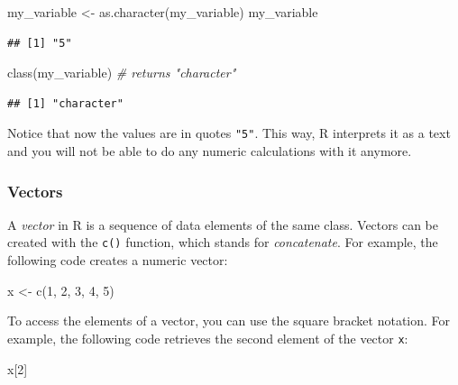 \documentclass[
]{book}
\newenvironment{Shaded}{\begin{snugshade}}{\end{snugshade}}
\newcommand{\CommentTok}[1]{\textcolor[rgb]{0.56,0.35,0.01}{\textit{#1}}}
\newcommand{\DecValTok}[1]{\textcolor[rgb]{0.00,0.00,0.81}{#1}}
\newcommand{\FunctionTok}[1]{\textcolor[rgb]{0.00,0.00,0.00}{#1}}
\newcommand{\NormalTok}[1]{#1}
\newcommand{\OtherTok}[1]{\textcolor[rgb]{0.56,0.35,0.01}{#1}}
\begin{document}
\begin{Shaded}
\begin{Highlighting}[]
\NormalTok{my\_variable }\OtherTok{\textless{}{-}} \FunctionTok{as.character}\NormalTok{(my\_variable)}
\NormalTok{my\_variable}
\end{Highlighting}
\end{Shaded}

\begin{verbatim}
## [1] "5"
\end{verbatim}

\begin{Shaded}
\begin{Highlighting}[]
\FunctionTok{class}\NormalTok{(my\_variable) }\CommentTok{\# returns "character"}
\end{Highlighting}
\end{Shaded}

\begin{verbatim}
## [1] "character"
\end{verbatim}

Notice that now the values are in quotes \texttt{"5"}. This way, R interprets it as a text and you will not be able to do any numeric calculations with it anymore.

\hypertarget{vectors}{%
\subsubsection{Vectors}\label{vectors}}

A \emph{vector} in R is a sequence of data elements of the same class. Vectors can be created with the \texttt{c()} function, which stands for \emph{concatenate}. For example, the following code creates a numeric vector:

\begin{Shaded}
\begin{Highlighting}[]
\NormalTok{x }\OtherTok{\textless{}{-}} \FunctionTok{c}\NormalTok{(}\DecValTok{1}\NormalTok{, }\DecValTok{2}\NormalTok{, }\DecValTok{3}\NormalTok{, }\DecValTok{4}\NormalTok{, }\DecValTok{5}\NormalTok{)}
\end{Highlighting}
\end{Shaded}

To access the elements of a vector, you can use the square bracket notation. For example, the following code retrieves the second element of the vector \texttt{x}:

\begin{Shaded}
\begin{Highlighting}[]
\NormalTok{x[}\DecValTok{2}\NormalTok{]}
\end{Highlighting}
\end{Shaded}
\end{document}
